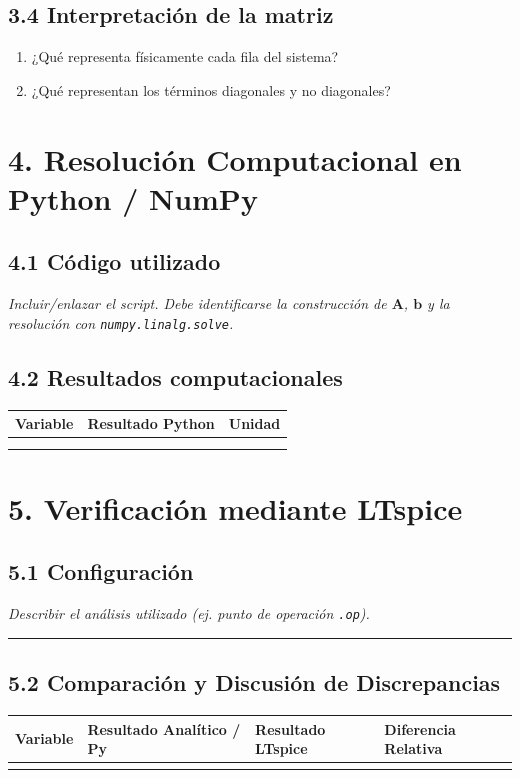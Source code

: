 \documentclass[11pt, a4paper]{article}
\begin{document}
\subsection*{3.4 Interpretación de la matriz}
\begin{enumerate}[itemsep=6pt]
    \item ¿Qué representa físicamente cada fila del sistema? \hrulefill
    \item ¿Qué representan los términos diagonales y no diagonales? \hrulefill
\end{enumerate}

\section*{4. Resolución Computacional en Python / NumPy}
\subsection*{4.1 Código utilizado}
\textit{Incluir/enlazar el script. Debe identificarse la construcción de $\mathbf{A}$, $\mathbf{b}$ y la resolución con \texttt{numpy.linalg.solve}.}
\vspace{2cm}

\subsection*{4.2 Resultados computacionales}
\begin{tabularx}{\linewidth}{@{}|l|X|l|@{}}
    \hline
    \textbf{Variable} & \textbf{Resultado Python} & \textbf{Unidad} \\
    \hline
    & & \\
    \hline
    & & \\
    \hline
\end{tabularx}

\section*{5. Verificación mediante LTspice}
\subsection*{5.1 Configuración}
\textit{Describir el análisis utilizado (ej. punto de operación \texttt{.op}).} 

\vspace{0.4cm}
\rule{\linewidth}{0.4pt}

\subsection*{5.2 Comparación y Discusión de Discrepancias}
\begin{tabularx}{\linewidth}{@{}|l|X|X|X|@{}}
    \hline
    \textbf{Variable} & \textbf{Resultado Analítico / Py} & \textbf{Resultado LTspice} & \textbf{Diferencia Relativa} \\
    \hline
    & & & \\
    \hline
\end{tabularx}
\end{document}
